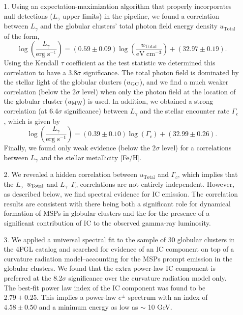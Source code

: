 \documentclass[doublespace,nopageskip]{VTthesis}
\begin{document}
\begin{itemize}
    \item[1.] Using an expectation-maximization algorithm that properly incorporates null detections ($L_\gamma$ upper limits) in the pipeline, we found a correlation between $L_\gamma$ and the globular clusters' total photon field energy density $u_\mathrm{Total}$ of the form, \begin{equation}
    \log\left(\frac{L_\gamma}{\mathrm{erg}\;\mathrm{s}^{-1}}\right) = (0.59 \pm 0.09)\log\left(\frac{u_\mathrm{Total}}{\mathrm{eV}\;\mathrm{cm}^{-3}}\right) + (32.97 \pm 0.19).
    \end{equation}
    Using the Kendall $\tau$ coefficient as the test statistic we determined this correlation to have a $3.8\sigma$ significance. The total photon field is dominated by the stellar light of the globular clusters  ($u_{\rm GC}$), and we find a much weaker correlation (below the 2$\sigma$ level) when only the photon field at the location of the globular cluster ($u_{\rm MW}$) is used. In addition, we obtained a strong correlation (at 6.4$\sigma$ significance) between $L_\gamma$ and the stellar encounter rate $\Gamma_c$, which is given by 
    \begin{equation}
    \log\left(\frac{L_\gamma}{\mathrm{erg}\;\mathrm{s}^{-1}}\right) = (0.39 \pm 0.10)\log\left(\Gamma_c\right) + (32.99 \pm 0.26).
    \end{equation}
    Finally, we found only weak evidence (below the 2$\sigma$ level) for a correlations between $L_\gamma$ and the stellar metallicity [Fe/H].
    \item[2.] We revealed a hidden correlation between $u_\mathrm{Total}$ and $\Gamma_c$, which implies that the $L_\gamma$--$u_{\rm Total}$ and $L_\gamma$--$\Gamma_c$ correlations are not entirely independent. However, as described below, we find spectral evidence for IC emission. The correlation results are consistent with there being both a significant role for dynamical formation of MSPs in globular clusters and the for the presence of a significant contribution of IC to the observed gamma-ray luminosity.
    \item[3.] We applied a universal spectral fit to the sample of 30 globular clusters in the 4FGL catalog and searched for evidence of an IC component on top of a curvature radiation model--accounting for the MSPs prompt emission in the globular clusters. We found that the extra power-law IC component is preferred at the 8.2$\sigma$ significance over the curvature radiation model only. The best-fit power law index of the IC component was found to be $2.79 \pm 0.25$. This implies a power-law $e^\pm$ spectrum with an index of $4.58 \pm 0.50$ and a minimum energy as low as $\sim$ 10 GeV. 

\end{itemize}
\end{document}
